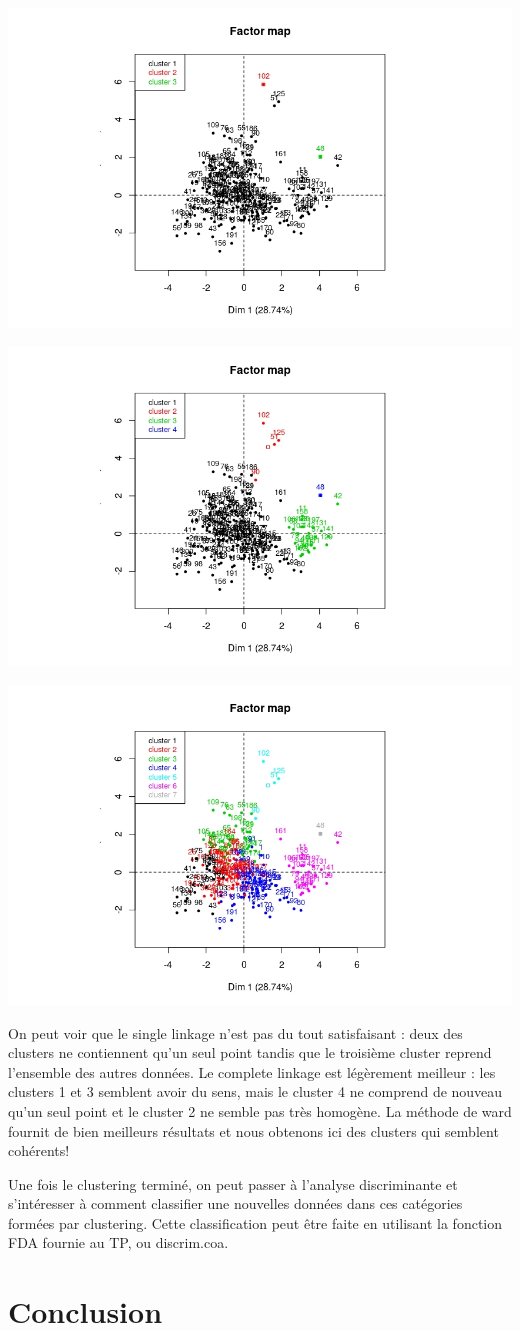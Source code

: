 \documentclass[11pt,a4paper]{article}
\begin{document}
\begin{center}

\includegraphics[width=.4\textwidth]{"single-pca"}


\includegraphics[width=.4\textwidth]{"complete-pca"}


\includegraphics[width=.4\textwidth]{"ward-pca"}


\end{center}


On peut voir que le single linkage n'est pas du tout satisfaisant : deux des clusters ne contiennent qu'un seul point tandis que le troisième cluster reprend l'ensemble des autres données. Le complete linkage est légèrement meilleur : les clusters 1 et 3 semblent avoir du sens, mais le cluster 4 ne comprend de nouveau qu'un seul point et le cluster 2 ne semble pas très homogène. La méthode de ward fournit de bien meilleurs résultats et nous obtenons ici des clusters qui semblent cohérents!


Une fois le clustering terminé, on peut passer à l'analyse discriminante et s'intéresser à comment classifier une nouvelles données dans ces catégories formées par clustering. Cette classification peut être faite en utilisant la fonction FDA fournie au TP, ou discrim.coa.




\section{Conclusion}
\end{document}

